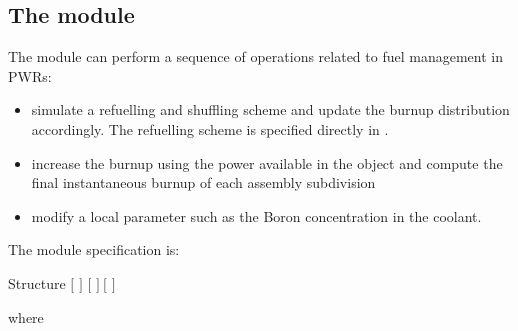 \subsection{The  module}\label{sect:sim}

\vskip 0.2cm
The  module can perform a sequence of operations related to
fuel management in PWRs:
\begin{itemize}
\item simulate a refuelling and shuffling scheme and update the burnup distribution
accordingly. The refuelling scheme is specified directly in .
\item increase the burnup using the power available in the  object
and compute the final instantaneous burnup of each assembly subdivision
\item modify a local parameter such as the Boron concentration in the coolant.
\end{itemize}

\noindent
The  module specification is:

\begin{DataStructure}{Structure }\label{table:tsim}
 $[$  $]$ \moc{:=}   $[$  $]~[$  $]$ \\
\moc{::} 
\end{DataStructure}

\noindent where

